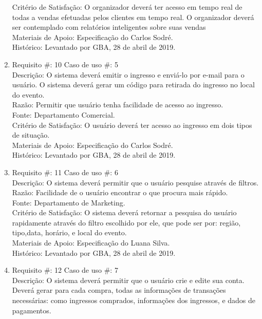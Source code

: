 \documentclass[12pt]{article}
\begin{document}
\begin{enumerate}
                    Critério de Satisfação: O organizador deverá ter acesso em tempo real de todas a vendas efetuadas pelos clientes em tempo real. O organizador deverá ser contemplado com relatórios inteligentes sobre suas vendas\\
                    Materiais de Apoio: Especificação do Carlos Sodré.\\
                    Histórico: Levantado por GBA, 28 de abril de 2019.\\
                \item Requisito \#: 10 Caso de uso \#: 5\\
                    Descrição: O sistema deverá emitir o ingresso e enviá-lo por e-mail para o usuário. O sistema deverá gerar um código para retirada do ingresso no local do evento.\\
                    Razão: Permitir que usuário tenha facilidade de acesso ao ingresso.\\
                    Fonte: Departamento Comercial.\\
                    Critério de Satisfação: O usuário deverá ter acesso ao ingresso em dois tipos de situação.\\
                    Materiais de Apoio: Especificação do Carlos Sodré.\\
                    Histórico: Levantado por GBA, 28 de abril de 2019.\\
                \item 	Requisito \#: 11 Caso de uso \#: 6\\
                    Descrição: O sistema deverá permitir que o usuário pesquise através de filtros.\\
                    Razão: Facilidade de o usuário encontrar o que procura mais rápido. \\
                    Fonte: Departamento de Marketing. \\
                    Critério de Satisfação: O sistema deverá retornar a pesquisa do usuário rapidamente através do filtro escolhido por ele, que pode ser por: região, tipo,data, horário, e local do evento.\\ 
                    Materiais de Apoio: Especificação do Luana Silva.\\
                    Histórico: Levantado por GBA, 28 de abril de 2019.\\
                \item Requisito \#: 12 Caso de uso \#: 7\\
                    Descrição: O sistema deverá permitir que o usuário crie e edite sua conta. Deverá gerar para cada compra, todas as informações de transações necessárias: como ingressos comprados, informações dos ingressos, e dados de pagamentos. \\

\end{enumerate}
\end{document}
